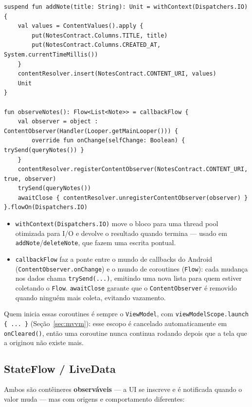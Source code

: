 \documentclass[11pt,a4paper]{article}
\begin{document}
\begin{lstlisting}[caption={withContext para offload de I/O e callbackFlow para observar mudanças}, label=lst:coroutines]
suspend fun addNote(title: String): Unit = withContext(Dispatchers.IO) {
    val values = ContentValues().apply {
        put(NotesContract.Columns.TITLE, title)
        put(NotesContract.Columns.CREATED_AT, System.currentTimeMillis())
    }
    contentResolver.insert(NotesContract.CONTENT_URI, values)
    Unit
}

fun observeNotes(): Flow<List<Note>> = callbackFlow {
    val observer = object : ContentObserver(Handler(Looper.getMainLooper())) {
        override fun onChange(selfChange: Boolean) { trySend(queryNotes()) }
    }
    contentResolver.registerContentObserver(NotesContract.CONTENT_URI, true, observer)
    trySend(queryNotes())
    awaitClose { contentResolver.unregisterContentObserver(observer) }
}.flowOn(Dispatchers.IO)
\end{lstlisting}

\begin{itemize}
    \item \texttt{withContext(Dispatchers.IO)} move o bloco para uma
    thread pool otimizada para I/O e devolve o resultado quando termina
    — usado em \texttt{addNote}/\texttt{deleteNote}, que fazem uma
    escrita pontual.
    \item \texttt{callbackFlow} faz a ponte entre o mundo de callbacks
    do Android (\texttt{ContentObserver.onChange}) e o mundo de
    coroutines (\texttt{Flow}): cada mudança nos dados chama
    \texttt{trySend(...)}, emitindo uma nova lista para quem estiver
    coletando o \texttt{Flow}. \texttt{awaitClose} garante que o
    \texttt{ContentObserver} é removido quando ninguém mais coleta,
    evitando vazamento.
\end{itemize}

Quem inicia essas coroutines é sempre o \texttt{ViewModel}, com
\texttt{viewModelScope.launch \{ ... \}} (Seção~\ref{sec:mvvm}): esse
escopo é cancelado automaticamente em \texttt{onCleared()}, então uma
coroutine nunca continua rodando depois que a tela que a originou não
existe mais.

\subsection{StateFlow / LiveData}
\label{sec:stateflow-livedata}

Ambos são contêineres \textbf{observáveis} — a UI se inscreve e é
notificada quando o valor muda — mas com origens e comportamento
diferentes:
\end{document}
